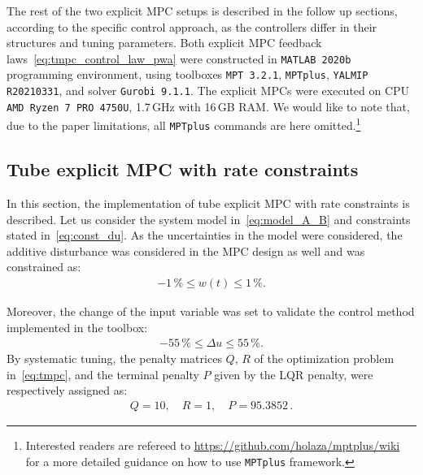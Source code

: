 \documentclass[letterpaper, 10 pt, conference]{ieeeconf}
\begin{document}
The rest of the two explicit MPC setups is described in the follow up sections, according to the specific control approach, as the controllers differ in their structures and tuning parameters. Both explicit MPC feedback laws~\eqref{eq:tmpc_control_law_pwa} were constructed in \texttt{MATLAB 2020b} programming environment, using toolboxes  \texttt{MPT 3.2.1}, \texttt{MPTplus}, \texttt{YALMIP R20210331},
and solver \texttt{Gurobi 9.1.1}. The explicit MPCs were executed on
CPU \texttt{AMD Ryzen 7 PRO 4750U}, 1.7\,GHz with 16\,GB RAM. 
We would like to note that, due to the paper limitations, all \texttt{MPTplus} commands are here omitted.\footnote{Interested readers are refereed to \url{https://github.com/holaza/mptplus/wiki} for a more detailed guidance on how to use \texttt{MPTplus} framework.}



\subsection{Tube explicit MPC with rate constraints}
\label{sec:tube_exp}

In this section, the implementation of tube explicit MPC with rate constraints is described. Let us consider the system model in~\eqref{eq:model_A_B} and constraints stated in~\eqref{eq:const_du}. 
As the uncertainties in the model were considered, the additive disturbance was considered in the MPC design as well and was constrained as:
\begin{eqnarray}
	\label{eq:const_w}
	-1\,\% \le w(t) \le 1\,\%.
\end{eqnarray}

Moreover, the change of the input variable was set to validate the control method implemented in the toolbox:
\begin{eqnarray}
	\label{eq:const_du}
	-55\,\% \le \Delta u \le 55\,\%.
\end{eqnarray}
By systematic tuning, the penalty matrices $Q$, $R$ of the optimization problem in~\eqref{eq:tmpc}, and the terminal penalty $P$ given by the LQR penalty, were respectively assigned as:
\begin{eqnarray}
\label{eq:setup_penalty}
Q = 10, \quad R = 1, \quad P = 95.3852 \, .
\end{eqnarray}
\end{document}
